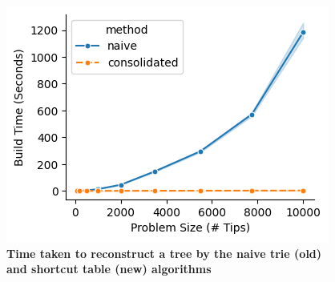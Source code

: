 \begin{center}
\begin{figure}[h]
\includegraphics[width=\linewidth]{img/time_by_tips.png}
\caption{\textbf{Time taken to reconstruct a tree by the naive trie (old) and shortcut table (new) algorithms}}
\label{fig:comparison}
\end{figure}
\end{center}